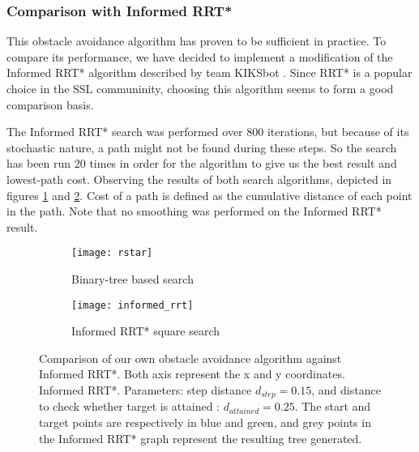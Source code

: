 \subsubsection{Comparison with Informed RRT*}
This obstacle avoidance algorithm has proven to be sufficient in practice. To compare its performance, we have decided to implement
a modification of the Informed RRT* algorithm described by team KIKSbot \cite{tdp_kiksbot_2023}. Since RRT* is a popular choice in the SSL communinity,
choosing this algorithm seems to form a good comparison basis.

The Informed RRT* search was performed over 800 iterations, but because of its stochastic nature, a path might not be found
during these steps. So the search has been run 20 times in order for the algorithm to give us the best result and lowest-path cost.
Observing the results of both search algorithms, depicted in figures \ref{fig:own-obs-avoid} and \ref{fig:informed-rrt-star}.
Cost of a path is defined as the cumulative distance of each point in the path. Note that no smoothing was performed on the Informed RRT* result.

\begin{figure}[h]
    \centering
    \begin{subfigure}[c][][c]{0.4\linewidth}
        \texttt{[image: rstar]}
        \caption{Binary-tree based search}
        \label{fig:own-obs-avoid}
    \end{subfigure}
    \hfill
    \begin{subfigure}[c][][c]{0.4\linewidth}
        \texttt{[image: informed\_rrt]}
        \caption{Informed RRT* square search}
        \label{fig:informed-rrt-star}
    \end{subfigure}
    \label{fig:avoidance}
    \caption{Comparison of our own obstacle avoidance algorithm against Informed RRT*. Both axis represent the x and y coordinates.
    Informed RRT*. Parameters: step distance $d_{step} = 0.15$, and distance to check whether target is attained : $d_{attained} = 0.25$.
    The start and target points are respectively in blue and green,
    and grey points in the Informed RRT* graph represent the resulting tree generated.}
\end{figure}
